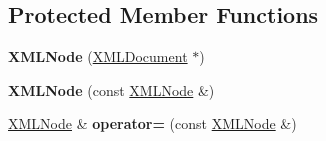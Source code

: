 \subsection*{Protected Member Functions}
\begin{DoxyCompactItemize}
\item 
{\bfseries X\+M\+L\+Node} (\hyperlink{classtinyxml2_1_1_x_m_l_document}{X\+M\+L\+Document} $\ast$)\hypertarget{classtinyxml2_1_1_x_m_l_node_a29868df6ca383d574f584dfdd15105b6}{}\label{classtinyxml2_1_1_x_m_l_node_a29868df6ca383d574f584dfdd15105b6}

\item 
{\bfseries X\+M\+L\+Node} (const \hyperlink{classtinyxml2_1_1_x_m_l_node}{X\+M\+L\+Node} \&)\hypertarget{classtinyxml2_1_1_x_m_l_node_a78be01384518a969da905548f318d75b}{}\label{classtinyxml2_1_1_x_m_l_node_a78be01384518a969da905548f318d75b}

\item 
\hyperlink{classtinyxml2_1_1_x_m_l_node}{X\+M\+L\+Node} \& {\bfseries operator=} (const \hyperlink{classtinyxml2_1_1_x_m_l_node}{X\+M\+L\+Node} \&)\hypertarget{classtinyxml2_1_1_x_m_l_node_ade79231d908e1f21862819e00e56ab6e}{}\label{classtinyxml2_1_1_x_m_l_node_ade79231d908e1f21862819e00e56ab6e}

\end{DoxyCompactItemize}
